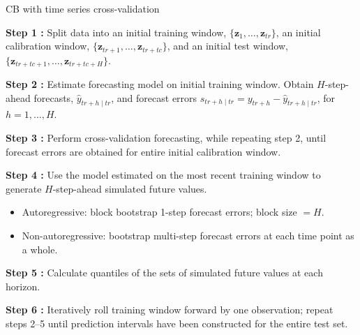 \documentclass[
  12pt,
  ignorenonframetext,
  aspectratio=169,
]{beamer}
\begin{document}
\begin{frame}{CB with time series cross-validation}
\label{cb-with-time-series-cross-validation-1}
\begin{block}{}
\fontsize{9}{9}\sf
\color{blue} \textbf{Step 1 :} \color{black} Split data into an initial training window, $\{\bm{z}_{1}, \dots, \bm{z}_{tr}\}$, an initial calibration window, $\{\bm{z}_{tr + 1}, \dots, \bm{z}_{tr + tc}\}$, and an initial test window, $\{\bm{z}_{tr + tc + 1}, \dots, \bm{z}_{tr + tc + H}\}$.
\end{block}

\begin{block}{}
\fontsize{9}{9}\sf
\color{violet} \textbf{Step 2 :} \color{black} Estimate forecasting model on initial training window. Obtain $H$-step-ahead forecasts, $\hat{y}_{tr + h \mid tr}$, and forecast errors $s_{tr + h \mid tr} = y_{tr + h} - \hat{y}_{tr + h \mid tr}$, for $h = 1, \dots, H$.
\end{block}

\begin{block}{}
\fontsize{9}{9}\sf
\color{blue} \textbf{Step 3 :} \color{black} Perform cross-validation forecasting, while repeating step 2, until forecast errors are obtained for entire initial calibration window.
\end{block}

\begin{block}{}
\fontsize{9}{9}\sf
\color{violet} \textbf{Step 4 :} \color{black} Use the model estimated on the most recent training window to generate $H$-step-ahead simulated future values.
\begin{itemize}
  \item Autoregressive: block bootstrap 1-step forecast errors; block size $ = H$.
  \item Non-autoregressive: bootstrap multi-step forecast errors at each time point as a whole.
\end{itemize}
\end{block}

\begin{block}{}
\fontsize{9}{9}\sf
\color{blue} \textbf{Step 5 :} \color{black} Calculate quantiles of the sets of simulated future values at each horizon.
\end{block}

\begin{block}{}
\fontsize{9}{9}\sf
\color{violet} \textbf{Step 6 :} \color{black} Iteratively roll training window forward by one observation; repeat steps 2--5 until prediction intervals have been constructed for the entire test set. 
\end{block}
\end{frame}
\end{document}
